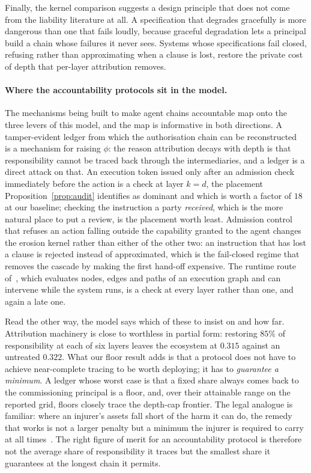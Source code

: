 \documentclass[11pt,a4paper]{article}
\theoremstyle{definition}
\begin{document}
Finally, the kernel comparison suggests a design principle that does not come
from the liability literature at all. A specification that degrades gracefully
is more dangerous than one that fails loudly, because graceful degradation lets
a principal build a chain whose failures it never sees. Systems whose
specifications fail closed, refusing rather than approximating when a clause is
lost, restore the private cost of depth that per-layer attribution removes.

\paragraph{Where the accountability protocols sit in the model.}
The mechanisms being built to make agent chains accountable map onto the three
levers of this model, and the map is informative in both directions. A
tamper-evident ledger from which the authorisation chain can be
reconstructed~\citep{fernandez2026acp} is a mechanism for raising $\phi$: the
reason attribution decays with depth is that responsibility cannot be traced
back through the intermediaries, and a ledger is a direct attack on that. An
execution token issued only after an admission check immediately before the
action is a check at layer $k=d$, the placement
Proposition~\ref{prop:audit} identifies as dominant and which is worth a factor
of $18$ at our baseline; checking the instruction a party \emph{received}, which
is the more natural place to put a review, is the placement worth least.
Admission control that refuses an action falling outside the capability granted
to the agent changes the erosion kernel rather than either of the other two: an
instruction that has lost a clause is rejected instead of approximated, which
is the fail-closed regime that removes the cascade by making the first hand-off
expensive. The runtime route of~\citet{he2025sentinelagent}, which evaluates
nodes, edges and paths of an execution graph and can intervene while the system
runs, is a check at every layer rather than one, and again a late one.

Read the other way, the model says which of these to insist on and how far.
Attribution machinery is close to worthless in partial form: restoring $85\%$
of responsibility at each of six layers leaves the ecosystem at $0.315$ against
an untreated $0.322$. What our floor result adds is that a protocol does not
have to achieve near-complete tracing to be worth deploying; it has to
\emph{guarantee a minimum}. A ledger whose worst case is that a fixed share
always comes back to the commissioning principal is a floor, and, over their
attainable range on the reported grid, floors closely trace the depth-cap
frontier. The legal analogue is familiar: where an injurer's assets
fall short of the harm it can do, the remedy that works is not a larger penalty
but a minimum the injurer is required to carry at all
times~\citep{shavell1986judgment,shavell2005minimum}. The right figure of merit for an accountability protocol
is therefore not the average share of responsibility it traces but the smallest
share it guarantees at the longest chain it permits.
\end{document}
